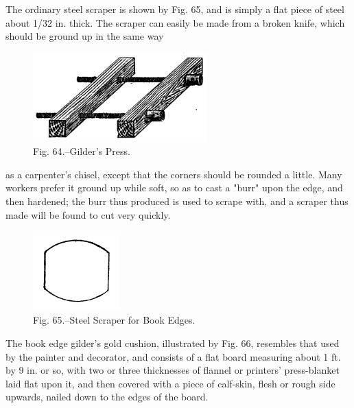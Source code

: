 \documentclass[twoside]{book}
\begin{document}
The ordinary steel scraper is shown by Fig. 65,
and is simply a flat piece of steel about 1/32 in.
thick. The scraper can easily be made from a broken
knife, which should be ground up in the same way
	\begin{figure}[h]
		\centering
		\includegraphics[width=0.6\textwidth]{Figures/_064.png}
		\caption*{Fig. 64.--Gilder's Press.}
	\end{figure}
as a carpenter's chisel, except that the corners
should be rounded a little. Many workers prefer
it ground up while soft, so as to cast a "burr" upon
the edge, and then hardened; the burr thus produced
is used to scrape with, and a scraper thus made
will be found to cut very quickly.

	\begin{figure}[h]
		\centering
		\includegraphics[width=0.3\textwidth]{Figures/_065.png}
		\caption*{Fig. 65.--Steel Scraper for Book Edges.}
	\end{figure}

The book edge gilder's gold cushion, illustrated
by Fig. 66, resembles that used by the painter and
decorator, and consists of a flat board measuring
about 1 ft. by 9 in. or so, with two or three thicknesses
of flannel or printers' press-blanket laid flat
upon it, and then covered with a piece of calf-skin,
\pagebreak
flesh or rough side upwards, nailed down to the
edges of the board.
\end{document}

